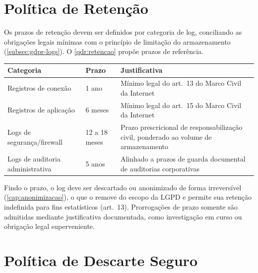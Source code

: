 \section{Política de Retenção}
\label{sec:politica-retencao}

Os prazos de retenção devem ser definidos por categoria de log, conciliando as obrigações legais mínimas com o princípio de limitação do armazenamento (\autoref{subsec:gdpr-logs}). O \autoref{qdr:retencao} propõe prazos de referência.

\begin{quadro}[htb]
    \caption{\label{qdr:retencao}Prazos de retenção propostos por categoria de log}
    \begin{tabular}{|p{3.5cm}|p{2.5cm}|p{7.8cm}|}
        \hline
        \textbf{Categoria} & \textbf{Prazo} & \textbf{Justificativa} \\
        \hline
        Registros de conexão & 1 ano & Mínimo legal do art.\ 13 do Marco Civil da Internet \\
        \hline
        Registros de aplicação & 6 meses & Mínimo legal do art.\ 15 do Marco Civil da Internet \\
        \hline
        Logs de segurança/firewall & 12 a 18 meses & Prazo prescricional de responsabilização civil, ponderado ao volume de armazenamento \\
        \hline
        Logs de auditoria administrativa & 5 anos & Alinhado a prazos de guarda documental de auditorias corporativas \\
        \hline
    \end{tabular}
\end{quadro}

Findo o prazo, o log deve ser descartado ou anonimizado de forma irreversível (\autoref{cap:anonimizacao}), o que o remove do escopo da LGPD e permite sua retenção indefinida para fins estatísticos (art.\ 13). Prorrogações de prazo somente são admitidas mediante justificativa documentada, como investigação em curso ou obrigação legal superveniente.

\section{Política de Descarte Seguro}
\label{sec:politica-descarte}

